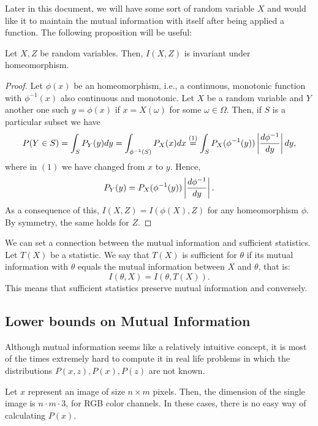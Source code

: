 Later in this document, we will have some sort of random variable $X$ and would like it to maintain the mutual information with itself after being applied a function. The following proposition will be useful:

\begin{nprop}
Let $X,Z$ be random variables. Then, $I(X,Z)$ is invariant under homeomorphism.
\end{nprop}
\begin{proof}
Let $\phi(x)$ be an homeomorphism, i.e., a continuous, monotonic function with $\phi^{-1}(x)$ also continuous and monotonic. Let $X$ be a random variable and $Y$ another one such $y = \phi(x)$ if $x = X(\omega)$ for some $\omega \in \Omega$. Then, if $S$ is a particular subset we have 
\[
P(Y \in S) = \int_S P_Y(y) dy = \int_{\phi^{-1}(S)}P_X(x) dx \stackrel{(1)}{=} \int_S P_X(\phi^{-1}(y)) \left\lvert \frac{d \phi^{-1}}{dy}\right\rvert dy,
\]
where in $(1)$ we have changed from $x$ to $y$. Hence, 
\[
P_Y(y) = P_X(\phi^{-1}(y))\left\lvert\frac{d \phi^{-1}}{dy}\right\rvert.
\]
As a consequence of this, $I(X,Z) = I(\phi(X),Z) $ for any homeomorphism $\phi$. By symmetry, the same holds for $Z$.

\end{proof}

\begin{remark} We can set a connection between the mutual information and sufficient statistics. Let $T(X)$ be a statistic. We say that $T(X)$  is sufficient for $\theta$ if its mutual information with $\theta$ equals the mutual information between $X$ and $\theta$, that is:
$$
I(\theta, X) = I (\theta, T(X)).
$$
This means that sufficient statistics preserve mutual information and conversely.
\end{remark}

\subsection{Lower bounds on Mutual Information}

Although mutual information seems like a relatively intuitive concept, it is most of the times extremely hard to compute it in real life problems in which the distributions $P(x,z),P(x),P(z)$ are not known.
\begin{nexample}
Let $x$ represent an image of size $n \times m$ pixels. Then, the dimension of the single image is $n \cdot m \cdot 3$, for RGB color channels. In these cases, there is no easy way of calculating $P(x)$.
\end{nexample}

